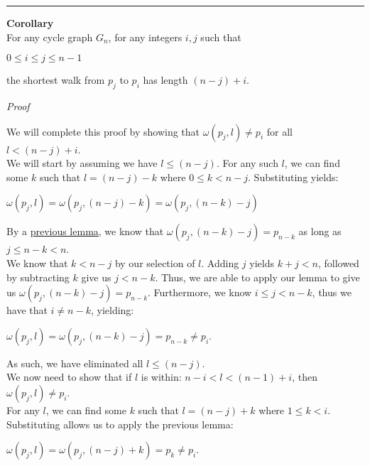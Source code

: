 \documentclass[a4paper,12pt]{article}
\begin{document}
\begin{center}
\noindent\rule{8cm}{0.4pt}
\end{center}



\label{corollary:shortest_walk_2}
\hypertarget{corollary:shortest_walk_2}{}
\begin{tcolorbox}
\textbf{Corollary}\\
For any cycle graph $G_n$, for any integers $i, j$ such that
\begin{center}
$0 \leq i \leq j \leq n - 1$
\end{center}
the shortest walk from $p_j$ to $p_i$ has length $(n - j) + i$.
\end{tcolorbox}

\noindent
\textit{Proof}

\noindent We will complete this proof by showing that $\omega(p_j, l) \neq p_i$ for all $l < (n - j) + i$.\\

\noindent We will start by assuming we have $l \leq (n - j)$. For any such $l$, we can find some $k$ such that $l = (n - j) - k$ where $0 \leq k < n - j$. Substituting yields:
\begin{center}
$\omega(p_j, l) = \omega(p_j, (n - j) - k) = \omega(p_j, (n - k) - j)$
\end{center}

\noindent By a \hyperlink{lemma:existence_of_walk_1}{previous lemma}, we know that $\omega(p_j, (n - k) - j) = p_{n - k}$ as long as $j \leq n - k < n$.\\

\noindent We know that $k < n - j$ by our selection of $l$. Adding $j$ yields $k + j < n$, followed by subtracting $k$ give us $j < n - k$. Thus, we are able to apply our lemma to give us $\omega(p_j, (n - k) - j) = p_{n - k}$. Furthermore, we know $i \leq j < n - k$, thus we have that $i \neq n - k$, yielding:
\begin{center}
$\omega(p_j, l) = \omega(p_j, (n - k) - j) = p_{n-k} \neq p_i$.
\end{center}

\noindent As such, we have eliminated all $l \leq (n - j)$.\\

\noindent We now need to show that if $l$ is within: $n - i < l < (n-1) + i$, then $\omega(p_j, l) \neq p_i$.\\

\noindent For any $l$, we can find some $k$ such that $l = (n - j) + k$ where $1 \leq k < i$. Substituting allows us to apply the previous lemma:
\begin{center}
$\omega(p_j, l) = \omega(p_j, (n - j) + k) = p_k \neq p_i$.
\end{center}
\end{document}
